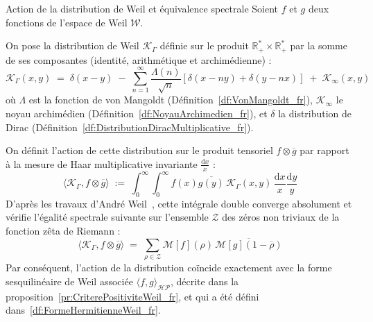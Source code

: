 \documentclass[Riemann_Hypothesis.tex]{subfiles}
\begin{document}
\begin{lemma}[label=lm:EquivalenceFormeWeil_fr]{Action de la distribution de Weil et équivalence spectrale}
    Soient $f$ et $g$ deux fonctions de l'espace de Weil $\mathcal{W}$. \par
    On pose la distribution de Weil $\mathcal{K}_{\Gamma}$ définie sur le produit $\mathbb{R}_+^* \times \mathbb{R}_+^*$ par la somme de ses composantes (identité, arithmétique et archimédienne) :
    \begin{equation*}
        \mathcal{K}_{\Gamma}(x,y) \;=\; \delta(x-y) \;-\; \sum_{n=1}^{\infty} \frac{\Lambda(n)}{\sqrt{n}} \left[ \delta\left(x - ny\right) + \delta\left(y - nx\right) \right] \;+\; \mathcal{K}_{\infty}(x,y)
    \end{equation*}
    où $\Lambda$ est la fonction de von Mangoldt (Définition~\ref{df:VonMangoldt_fr}), 
    $\mathcal{K}_{\infty}$ le noyau archimédien (Définition~\ref{df:NoyauArchimedien_fr}), 
    et $\delta$ la distribution de Dirac 
    (Définition~\ref{df:DistributionDiracMultiplicative_fr}). \par
    On définit l'action de cette distribution sur le produit tensoriel $f \otimes \overline{g}$ par rapport à la mesure de Haar multiplicative invariante $\frac{\mathrm{d}x}{x}$ :
    \begin{equation*}
        \langle \mathcal{K}_{\Gamma}, f \otimes \overline{g} \rangle \;:=\; \int_{0}^{\infty} \int_{0}^{\infty} f(x) \overline{g(y)} \, \mathcal{K}_{\Gamma}(x,y) \, \frac{\mathrm{d}x}{x} \frac{\mathrm{d}y}{y}
    \end{equation*}
    D'après les travaux d'André Weil~\cite{weil1952_formules}, cette intégrale double converge absolument et vérifie l'égalité spectrale suivante sur l'ensemble $\mathcal{Z}$ des zéros non triviaux de la fonction zêta de Riemann :
    \begin{equation*}
        \langle \mathcal{K}_{\Gamma}, f \otimes \overline{g} \rangle \;=\; \sum_{\rho \in \mathcal{Z}} \mathcal{M}[f](\rho) \, \overline{\mathcal{M}[g](1 - \overline{\rho})}
    \end{equation*}
    Par conséquent, l'action de la distribution coïncide exactement avec la forme
    sesquilinéaire de Weil associée $\langle f, g \rangle_{\mathcal{HP}}$,
    décrite dans la
    {proposition}~\ref{pr:CriterePositiviteWeil_fr},
    et qui a été défini dans~\ref{df:FormeHermitienneWeil_fr}.
\end{lemma}
\end{document}

